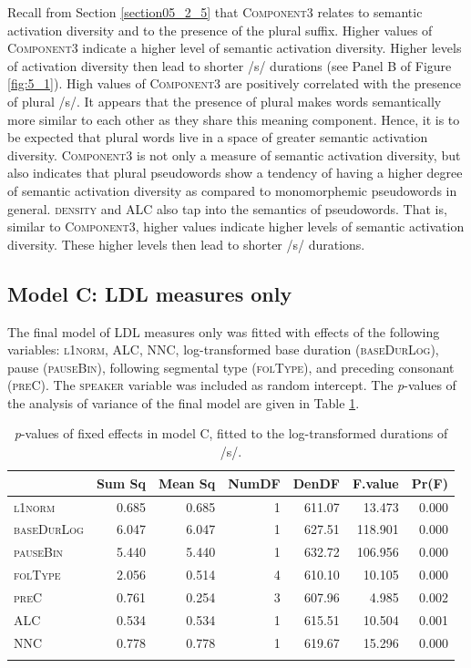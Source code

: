 Recall from Section \ref{section05_2_5} that \textsc{Component3} relates to semantic activation diversity and to the presence of the plural suffix. Higher values of \textsc{Component3} indicate a higher level of semantic activation diversity. Higher levels of activation diversity then lead to shorter /s/ durations (see Panel B of Figure \ref{fig:5_1}). High values of \textsc{Component3} are positively correlated with the presence of plural /s/. It appears that the presence of plural makes words semantically more similar to each other as they share this meaning component. Hence, it is to be expected that plural words live in a space of greater semantic activation diversity. \textsc{Component3} is not only a measure of semantic activation diversity, but also indicates that plural pseudowords show a tendency of having a higher degree of semantic activation diversity as compared to monomorphemic pseudowords in general. \textsc{density} and \textsc{ALC} also tap into the semantics of pseudowords. That is, similar to \textsc{Component3}, higher values indicate higher levels of semantic activation diversity. These higher levels then lead to shorter /s/ durations.

\subsection{Model C: LDL measures only}\label{section05_3_3}

The final model of LDL measures only was fitted with effects of the following variables: \textsc{l1norm}, \textsc{ALC}, \textsc{NNC}, log-transformed base duration (\textsc{baseDurLog}), pause (\textsc{pauseBin}), following segmental type (\textsc{folType}), and preceding consonant (\textsc{preC}). The \textsc{speaker} variable was included as random intercept. The \textit{p}-values of the analysis of variance of the final model are given in Table \ref{tab:5.10}.

\begin{table}\fontsize{10}{11}
\caption{\textit{p}-values of fixed effects in model C, fitted to the log-transformed durations of /s/.}
\label{tab:5.10}
\centering
\begin{tabular}{lrrrrrr} 
\lsptoprule
~          & Sum Sq & Mean Sq & NumDF & DenDF  & F.value & Pr(F)  \\ 
\midrule
\textsc{l1norm}     & 0.685  & 0.685   & 1     & 611.07 & 13.473  & 0.000  \\
\textsc{baseDurLog} & 6.047  & 6.047   & 1     & 627.51 & 118.901 & 0.000  \\
\textsc{pauseBin}   & 5.440  & 5.440   & 1     & 632.72 & 106.956 & 0.000  \\
\textsc{folType}    & 2.056  & 0.514   & 4     & 610.10 & 10.105  & 0.000  \\
\textsc{preC}       & 0.761  & 0.254   & 3     & 607.96 & 4.985   & 0.002  \\
\textsc{ALC}        & 0.534  & 0.534   & 1     & 615.51 & 10.504  & 0.001  \\
\textsc{NNC}        & 0.778  & 0.778   & 1     & 619.67 & 15.296  & 0.000  \\
\lspbottomrule
\end{tabular}
\end{table}

